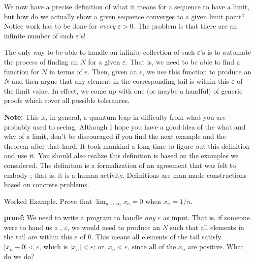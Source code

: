 We now have a precise definition of what it means for a sequence to have a
limit, but how do we actually show a given sequence converges to a given limit
point? Notice work has to be done for {\it every} $\varepsilon > 0$.  The problem
is that there are an infinite number of such $\varepsilon$'s!

The only way to be able to handle an infinite collection of such $\varepsilon$'s is
to automate the process of finding an $N$ for a given $\varepsilon$. That is, 
we need to be able to find a function for $N$ in terms of $\varepsilon$. Then, 
given an $\varepsilon$, we use this function to produce an $N$ and then argue 
that any element in the corresponding tail is within this $\varepsilon$ of 
the limit value. In effect, we come up with one (or maybe a handful) of generic proofs
which cover all possible tolerances.

{\bf Note:\/} This is, in general, a quantum leap in difficulty from what 
you are probably used to 
seeing. Although I hope you have a good idea of the what and why of a limit, 
don't be discouraged if you find the next example and 
the theorem after that hard. It took mankind a long time to figure out this 
definition and use it. You should also realize this definition 
is based on the examples we considered. The definition is a formalization 
of an agreement that was felt to embody ; that is, it is 
a human activity. Definitions are man made constructions based on 
concrete problems.

\proclaim Worked Example. Prove that $\lim_{n \rightarrow \infty} x_n = 0$
when $x_n = 1/n$.

{\bf proof:\/} We need to write a program to handle {\it any\/} $\varepsilon$ 
as input. That is, if
someone were to hand us a , 
$\varepsilon$, we would need to produce an $N$ such that all elements in the 
tail are within this $\varepsilon$ of $0$. This means all elements of the 
tail satisfy $|x_n - 0| < \varepsilon$, which is
$|x_n| < \varepsilon$; or, $x_n < \varepsilon$, since all
of the $x_n$ are positive.
What do we do? 


